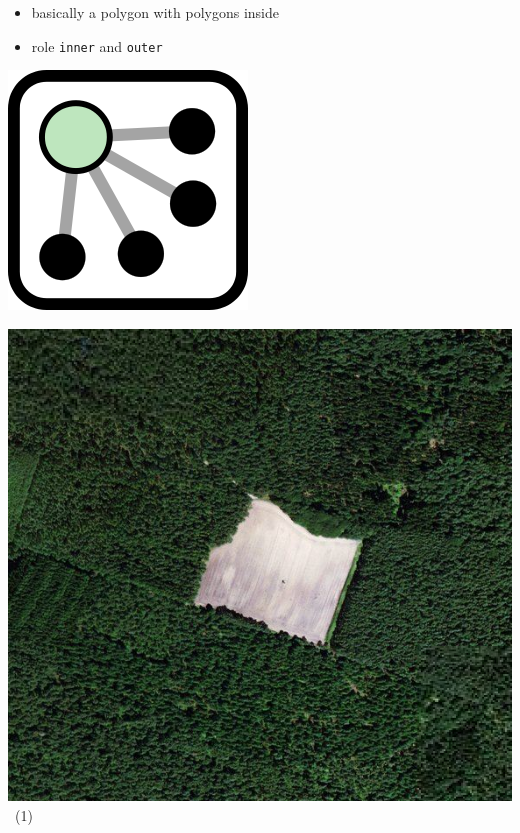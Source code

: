 \documentclass{beamer}
\begin{document}
	\begin{frame}
		\begin{itemize}
			\item basically a polygon with polygons inside
			\item role \texttt{inner} and \texttt{outer}
		\end{itemize}
		
		\vfill
		
		\begin{center}
			\begin{minipage}[b][0.6\textheight][c]{0.2\linewidth}
				\centering
				\includegraphics[width=0.5\linewidth,height=0.5\textheight,keepaspectratio]{images/240px-Mf_Relation.png}
			\end{minipage}
			\begin{minipage}[b][0.6\textheight][c]{0.4\linewidth}
				\centering
				\includegraphics[width=0.8\linewidth,height=0.8\textheight,keepaspectratio]{images/multipolygon.png}~\tiny{(1)}
			\end{minipage}

\end{center}
\end{frame}
\end{document}
